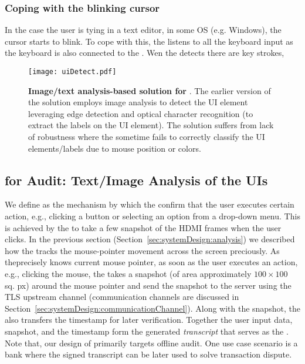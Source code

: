 \subsubsection{Coping with the blinking cursor} In the case the user is tying in a text editor, in some OS (e.g. Windows), the cursor starts to blink. To cope with this, the \device listens to all the keyboard input as the keyboard is also connected to the \device. Wen the \device detects there are key strokes,

\begin{figure}[t]
\centering
\texttt{[image: uiDetect.pdf]}
\caption{\textbf{Image/text analysis-based solution for \poa}. The earlier version of the \name solution employs image analysis to detect the UI element leveraging edge detection and optical character recognition (to extract the labels on the UI element). The solution suffers from lack of robustness where the \device sometime fails to correctly classify the UI elements/labels due to mouse position or colors.}
\label{fig:uiDetect}
\centering
\end{figure}



\subsection{\Poa for Audit: Text/Image Analysis of the UIs}
\label{sec:systemDesign:poa}


We define \emph{\poa} as the mechanism by which the \device confirm that the user executes certain action, e.g., clicking a button  or selecting an option from a drop-down menu. This is achieved by the \device to take a few snapshot of the HDMI frames when the user clicks. In the previous section (Section~\ref{sec:systemDesign:analysis}) we described how the \device tracks the mouse-pointer movement across the screen preciously. As the\device precisely knows current mouse pointer, as soon as the user executes an action, e.g., clicking the mouse, the \device takes a snapshot (of area approximately $100 \times 100$ sq. px) around the mouse pointer and send the snapshot to the server using the TLS upstream channel (communication channels are discussed in Section~\ref{sec:systemDesign:communicationChannel}). Along with the snapshot, the \device also transfers the timestamp for later verification. Together the user input data, snapshot, and the timestamp form the \device generated \emph{transcript} that serves as the \poa. Note that, our design of \poa primarily targets offline audit. One use case scenario is a bank where the signed transcript can be later used to solve transaction dispute. 


